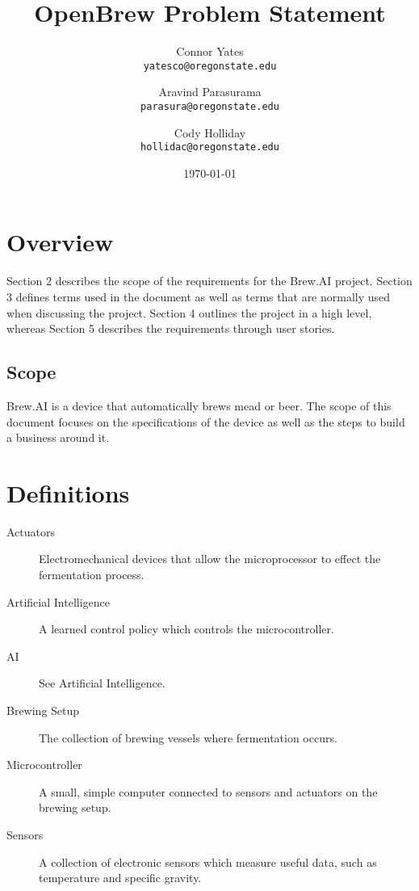 \documentclass[draftclsnofoot,onecolumn,letterpaper,10pt]{article}
\author{Connor Yates\\
\texttt{yatesco@oregonstate.edu}
\and
Aravind Parasurama\\
\texttt{parasura@oregonstate.edu}
\and
Cody Holliday\\
\texttt{hollidac@oregonstate.edu}}
\date{\today}
\title{OpenBrew Problem Statement}
\begin{document}
\maketitle

\newpage

\section{Overview}
Section 2 describes the scope of the requirements for the Brew.AI project.
Section 3 defines terms used in the document as well as terms that are normally used when discussing the project.
Section 4 outlines the project in a high level, whereas Section 5 describes the requirements through user stories.

\subsection{Scope}
Brew.AI is a device that automatically brews mead or beer.
The scope of this document focuses on the specifications of the device as well as the steps to build a business around it.


\section{Definitions}
\begin{description}
	\item[Actuators] Electromechanical devices that allow the microprocessor to effect the fermentation process.
	\item[Artificial Intelligence] A learned control policy which controls the microcontroller.
	\item[AI] See Artificial Intelligence.
	\item[Brewing Setup] The collection of brewing vessels where fermentation occurs.
	\item[Microcontroller] A small, simple computer connected to sensors and actuators on the brewing setup.
	\item[Sensors] A collection of electronic sensors which measure useful data, such as temperature and specific gravity.
\end{description}
\end{document}
